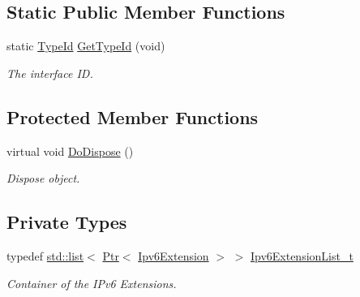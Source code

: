 \subsection*{Static Public Member Functions}
\begin{DoxyCompactItemize}
\item 
static \hyperlink{classns3_1_1TypeId}{Type\+Id} \hyperlink{classns3_1_1Ipv6ExtensionDemux_a7cb8446d38c0d6726cfa7636a0e700e1}{Get\+Type\+Id} (void)
\begin{DoxyCompactList}\small\item\em The interface ID. \end{DoxyCompactList}\end{DoxyCompactItemize}
\subsection*{Protected Member Functions}
\begin{DoxyCompactItemize}
\item 
virtual void \hyperlink{classns3_1_1Ipv6ExtensionDemux_a05cdf74c8c4bf557527dfb01a84ee0d5}{Do\+Dispose} ()
\begin{DoxyCompactList}\small\item\em Dispose object. \end{DoxyCompactList}\end{DoxyCompactItemize}
\subsection*{Private Types}
\begin{DoxyCompactItemize}
\item 
typedef \hyperlink{openflow-interface_8h_afd9bcfa176617760671b67580f536fa7}{std\+::list}$<$ \hyperlink{classns3_1_1Ptr}{Ptr}$<$ \hyperlink{classns3_1_1Ipv6Extension}{Ipv6\+Extension} $>$ $>$ \hyperlink{classns3_1_1Ipv6ExtensionDemux_a6e82323377e3ffddf4676830b8e79e4d}{Ipv6\+Extension\+List\+\_\+t}
\begin{DoxyCompactList}\small\item\em Container of the I\+Pv6 Extensions. \end{DoxyCompactList}\end{DoxyCompactItemize}
